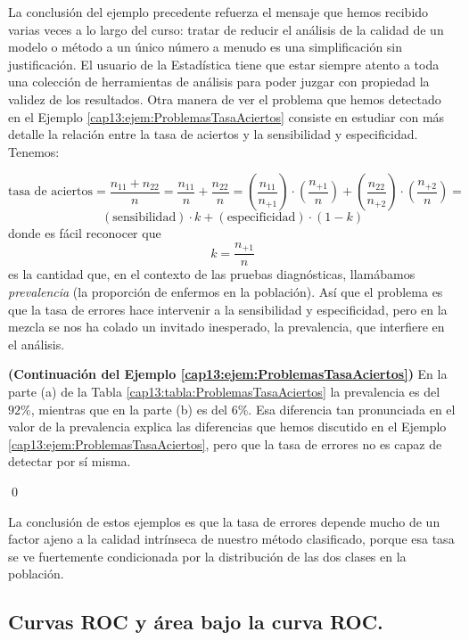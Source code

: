  La conclusión del ejemplo precedente refuerza el mensaje que hemos recibido varias veces a lo largo del curso: tratar de reducir el análisis de la calidad de un modelo o método a un único número a menudo es una simplificación sin justificación. El usuario de la Estadística tiene que estar siempre atento a toda una colección de herramientas de análisis para poder juzgar con propiedad la validez de los resultados.   Otra manera de ver el problema que hemos detectado en el Ejemplo \ref{cap13:ejem:ProblemasTasaAciertos} consiste en estudiar con más detalle la relación entre la tasa de aciertos y la sensibilidad y especificidad. Tenemos:

 \[
 \mbox{tasa de aciertos} = \dfrac{n_{11} + n_{22}}{n} = \dfrac{n_{11}}{n} + \dfrac{n_{22}}{n}  =
\left(\dfrac{n_{11}}{n_{+1}}\right) \cdot \left(\dfrac{n_{+1}}{n}\right) +
\left(\dfrac{n_{22}}{n_{+2}}\right) \cdot  \left(\dfrac{n_{+2}}{n}\right) =
 \]
 \[
\left( \mbox{sensibilidad}\right)\cdot k +  \left(\mbox{especificidad}\right)\cdot (1 - k)
 \]
 donde es fácil reconocer que
 \[
 k = \dfrac{n_{+1}}{n}
 \]
 es la cantidad que, en el contexto de las pruebas diagnósticas, llamábamos {\em prevalencia} (la proporción de enfermos en la población). Así que el problema es que la tasa de errores hace intervenir a la sensibilidad y especificidad, pero en la mezcla se nos ha colado un invitado inesperado, la prevalencia, que interfiere en el análisis.

 \begin{ejemplo}{\bf (Continuación del Ejemplo \ref{cap13:ejem:ProblemasTasaAciertos})}
 	\label{cap13:ejem:ProblemasTasaAciertos2}
 En la 	parte (a) de la Tabla \ref{cap13:tabla:ProblemasTasaAciertos} la prevalencia es del $92\%$, mientras que en la parte (b) es del $6\%$. Esa diferencia tan pronunciada en el valor de la prevalencia explica las diferencias que hemos discutido en el Ejemplo \ref{cap13:ejem:ProblemasTasaAciertos}, pero que la tasa de errores no es capaz de detectar por sí misma.
 	
 \qed	
\end{ejemplo}


La conclusión de estos ejemplos es que la tasa de errores depende mucho de un factor ajeno a la calidad intrínseca de nuestro método clasificado, porque esa tasa se ve fuertemente condicionada por la distribución de las dos clases en la población.


\subsection{Curvas ROC y área bajo la curva ROC.}
\label{cap13:subsection:ROC}

